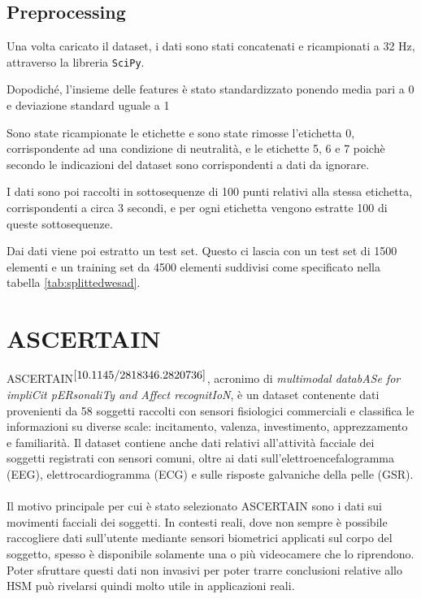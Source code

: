 \subsection{Preprocessing}
Una volta caricato il dataset, i dati sono stati concatenati e ricampionati a 32 Hz, attraverso la libreria \texttt{SciPy}.

Dopodiché, l'insieme delle features è stato standardizzato ponendo media pari a 0 e deviazione standard uguale a 1

Sono state ricampionate le etichette e sono state rimosse l'etichetta 0, corrispondente ad una condizione di neutralità, e le etichette 5, 6 e 7 poichè secondo le indicazioni del dataset sono corrispondenti a dati da ignorare.



I dati sono poi raccolti in sottosequenze di 100 punti relativi alla stessa etichetta, corrispondenti a circa 3 secondi, e per ogni etichetta vengono estratte 100 di queste sottosequenze.

Dai dati viene poi estratto un test set. Questo ci lascia con un test set di 1500 elementi e un training set da 4500 elementi suddivisi come specificato nella tabella \ref{tab:splittedwesad}.

\section{ASCERTAIN }
ASCERTAIN$^{\cite{10.1145/2818346.2820736}}$, acronimo di \textit{multimodal databASe for impliCit pERsonaliTy and Affect recognitIoN}, è un dataset contenente dati provenienti da 58 soggetti raccolti con sensori fisiologici commerciali e classifica le informazioni su diverse scale: incitamento, valenza, investimento, apprezzamento e familiarità. Il dataset contiene anche dati relativi all'attività facciale dei soggetti registrati con sensori comuni, oltre ai dati sull'elettroencefalogramma (EEG), elettrocardiogramma (ECG) e sulle risposte galvaniche della pelle (GSR).\\\\
Il motivo principale per cui è stato selezionato ASCERTAIN sono i dati sui movimenti facciali dei soggetti. In contesti reali, dove non sempre è possibile raccogliere dati sull'utente mediante sensori biometrici applicati sul corpo del soggetto, spesso è disponibile solamente una o più videocamere che lo riprendono. Poter sfruttare questi dati non invasivi per poter trarre conclusioni relative allo HSM può rivelarsi quindi molto utile in applicazioni reali.
